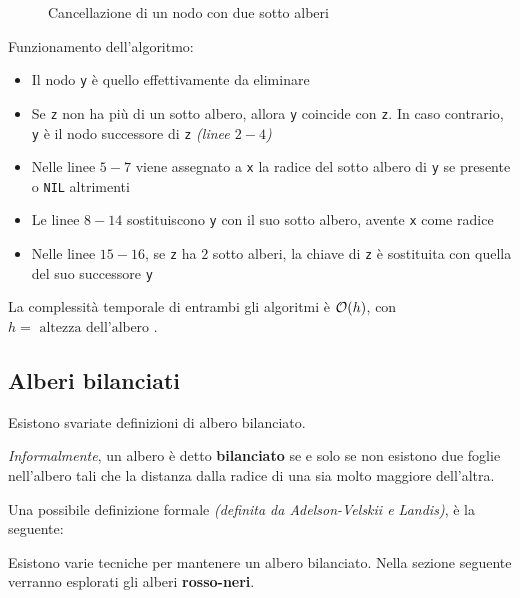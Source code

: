 \documentclass[italian, 10pt]{article}
\begin{document}
\begin{figure}[htbp]
  \bigskip
  \centering
  \caption{Cancellazione di un nodo con due sotto alberi}
  \label{fig:cancellazione-nodo-bst-con-due-sotto-alberi}
  \bigskip
\end{figure}

Funzionamento dell'algoritmo:

\begin{itemize}
  \item Il nodo \texttt{y} è quello effettivamente da eliminare
  \item Se \texttt{z} non ha più di un sotto albero, allora \texttt{y} coincide con \texttt{z}. In caso contrario, \texttt{y} è il nodo successore di \texttt{z} \textit{(linee \(2-4\))}
  \item Nelle linee \(5-7\) viene assegnato a \texttt{x} la radice del sotto albero di \texttt{y} se presente o \texttt{NIL} altrimenti
  \item Le linee \(8-14\) sostituiscono \texttt{y} con il suo sotto albero, avente \texttt{x} come radice
  \item Nelle linee \(15-16\), se \texttt{z} ha \(2\) sotto alberi, la chiave di \texttt{z} è sostituita con quella del suo successore \texttt{y}
\end{itemize}

\bigskip
La complessità temporale di entrambi gli algoritmi è \(\mathcal{O}(h)\), con \(h = \text{ altezza dell'albero }\).

\subsection{Alberi bilanciati}

Esistono svariate definizioni di albero bilanciato.

\textit{Informalmente}, un albero è detto \textbf{bilanciato} se e solo se non esistono due foglie nell'albero tali che la distanza dalla radice di una sia molto maggiore dell'altra.

Una possibile definizione formale \textit{(definita da Adelson-Velskii e Landis)}, è la seguente:


Esistono varie tecniche per mantenere un albero bilanciato.
Nella sezione seguente verranno esplorati gli alberi \textbf{rosso-neri}.
\end{document}
